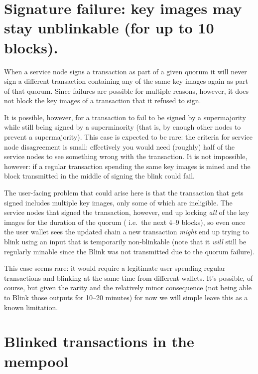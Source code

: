 \hypertarget{signature-failure-key-images-may-stay-unblinkable-for-up-to-10-blocks.}{%
\section{Signature failure: key images may stay unblinkable (for up to
10
blocks).}\label{signature-failure-key-images-may-stay-unblinkable-for-up-to-10-blocks.}}

When a service node signs a transaction as part of a given quorum it
will never sign a different transaction containing any of the same key
images again as part of that quorum. Since failures are possible for
multiple reasons, however, it does not block the key images of a
transaction that it refused to sign.

It is possible, however, for a transaction to fail to be signed by a
supermajority while still being signed by a superminority (that is, by
enough other nodes to prevent a supermajority). This case is expected to
be rare: the criteria for service node disagreement is small:
effectively you would need (roughly) half of the service nodes to see
something wrong with the transaction. It is not impossible, however: if
a regular transaction spending the same key images is mined and the
block transmitted in the middle of signing the blink could fail.

The user-facing problem that could arise here is that the transaction
that gets signed includes multiple key images, only some of which are
ineligible. The service nodes that signed the transaction, however, end
up locking \emph{all} of the key images for the duration of the quorum (
i.e.~the next 4--9 blocks), so even once the user wallet sees the
updated chain a new transaction \emph{might} end up trying to blink
using an input that is temporarily non-blinkable (note that it
\emph{will} still be regularly minable since the Blink was not
transmitted due to the quorum failure).

This case seems rare: it would require a legitimate user spending
regular transactions and blinking at the same time from different
wallets. It's possible, of course, but given the rarity and the
relatively minor consequence (not being able to Blink those outputs for
10--20 minutes) for now we will simple leave this as a known limitation.

\hypertarget{blinked-transactions-in-the-mempool}{%
\section{Blinked transactions in the
mempool}\label{blinked-transactions-in-the-mempool}}

